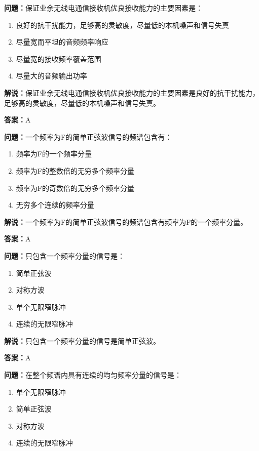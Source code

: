 \textbf{问题：}保证业余无线电通信接收机优良接收能力的主要因素是：

\begin{enumerate}[label=\Alph*), leftmargin=3em]
	\item 良好的抗干扰能力，足够高的灵敏度，尽量低的本机噪声和信号失真
	\item 尽量宽而平坦的音频频率响应
	\item 尽量宽的接收频率覆盖范围
	\item 尽量大的音频输出功率
\end{enumerate}

\textbf{解说：}保证业余无线电通信接收机优良接收能力的主要因素是良好的抗干扰能力，足够高的灵敏度，尽量低的本机噪声和信号失真。%

\textbf{答案：}A

\textbf{问题：}一个频率为F的简单正弦波信号的频谱包含有：

\begin{enumerate}[label=\Alph*), leftmargin=3em]
	\item 频率为F的一个频率分量
	\item 频率为F的整数倍的无穷多个频率分量
	\item 频率为F的奇数倍的无穷多个频率分量
	\item 无穷多个连续的频率分量
\end{enumerate}

\textbf{解说：}一个频率为F的简单正弦波信号的频谱包含有频率为F的一个频率分量。%

\textbf{答案：}A

\textbf{问题：}只包含一个频率分量的信号是：
\begin{enumerate}[label=\Alph*), leftmargin=3em]
	\item 简单正弦波
	\item 对称方波
	\item 单个无限窄脉冲
	\item 连续的无限窄脉冲
\end{enumerate}

\textbf{解说：}只包含一个频率分量的信号是简单正弦波。%

\textbf{答案：}A

\textbf{问题：}在整个频谱内具有连续的均匀频率分量的信号是：

\begin{enumerate}[label=\Alph*), leftmargin=3em]
	\item 单个无限窄脉冲
	\item 简单正弦波
	\item 对称方波
	\item 连续的无限窄脉冲
\end{enumerate}

